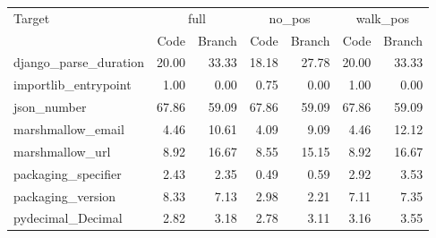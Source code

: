 \begin{tabular}{lrrrrrr}
\toprule
Target & \multicolumn{2}{c}{full} & \multicolumn{2}{c}{no\_pos} & \multicolumn{2}{c}{walk\_pos} \\
 & Code & Branch & Code & Branch & Code & Branch \\
\midrule
django\_parse\_duration & 20.00 & 33.33 & 18.18 & 27.78 & 20.00 & 33.33 \\
importlib\_entrypoint & 1.00 & 0.00 & 0.75 & 0.00 & 1.00 & 0.00 \\
json\_number & 67.86 & 59.09 & 67.86 & 59.09 & 67.86 & 59.09 \\
marshmallow\_email & 4.46 & 10.61 & 4.09 & 9.09 & 4.46 & 12.12 \\
marshmallow\_url & 8.92 & 16.67 & 8.55 & 15.15 & 8.92 & 16.67 \\
packaging\_specifier & 2.43 & 2.35 & 0.49 & 0.59 & 2.92 & 3.53 \\
packaging\_version & 8.33 & 7.13 & 2.98 & 2.21 & 7.11 & 7.35 \\
pydecimal\_Decimal & 2.82 & 3.18 & 2.78 & 3.11 & 3.16 & 3.55 \\
\bottomrule
\end{tabular}
